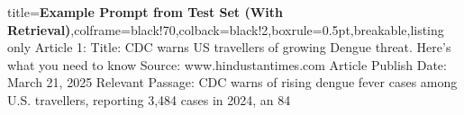 \begin{tcblisting}{title={\textbf{Example Prompt from Test Set (With Retrieval)}},colframe=black!70,colback=black!2,boxrule=0.5pt,breakable,listing only}
Article 1:
Title: CDC warns US travellers of growing Dengue threat. Here's what you need to know
Source: www.hindustantimes.com
Article Publish Date: March 21, 2025
Relevant Passage: CDC warns of rising dengue fever cases among U.S. travellers, reporting 3,484 cases in 2024, an 84%


\end{tcblisting}
